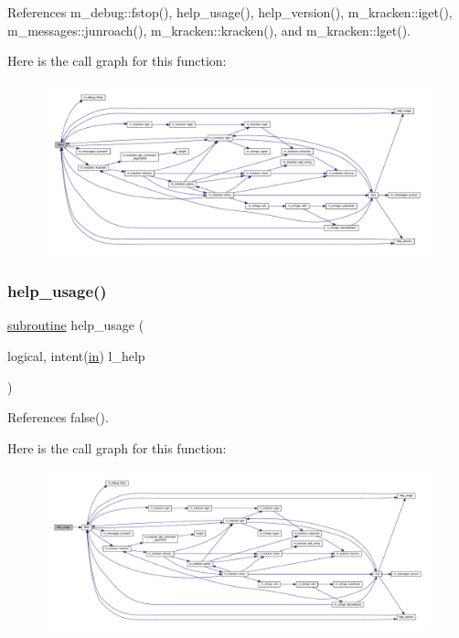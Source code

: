 References m\+\_\+debug\+::fstop(), help\+\_\+usage(), help\+\_\+version(), m\+\_\+kracken\+::iget(), m\+\_\+messages\+::junroach(), m\+\_\+kracken\+::kracken(), and m\+\_\+kracken\+::lget().

Here is the call graph for this function\+:
\nopagebreak
\begin{figure}[H]
\begin{center}
\leavevmode
\includegraphics[width=350pt]{__false_8f90_ac39cd9fe2012c31749944aa6b20b6c05_cgraph}
\end{center}
\end{figure}
\mbox{\label{__false_8f90_a3e09a3b52ee8fb04eeb93fe5761626a8}} 
\subsubsection{\texorpdfstring{help\+\_\+usage()}{help\_usage()}}
{\footnotesize\ttfamily \hyperlink{M__stopwatch_83_8txt_acfbcff50169d691ff02d4a123ed70482}{subroutine} help\+\_\+usage (\begin{DoxyParamCaption}\item[{logical, intent(\hyperlink{M__journal_83_8txt_afce72651d1eed785a2132bee863b2f38}{in})}]{l\+\_\+help }\end{DoxyParamCaption})}



References false().

Here is the call graph for this function\+:
\nopagebreak
\begin{figure}[H]
\begin{center}
\leavevmode
\includegraphics[width=350pt]{__false_8f90_a3e09a3b52ee8fb04eeb93fe5761626a8_cgraph}
\end{center}
\end{figure}
\mbox{\label{__false_8f90_a39c21619b08a3c22f19e2306efd7f766}} 
